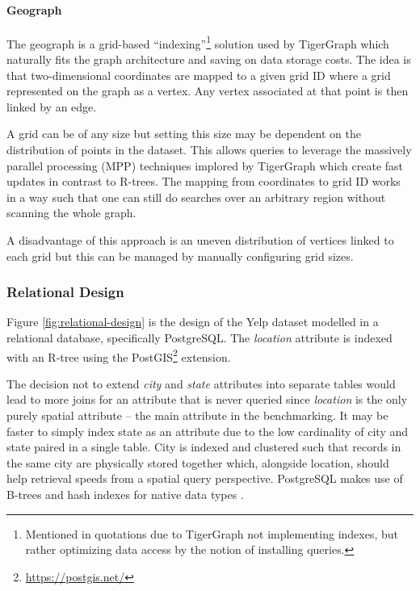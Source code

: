 \paragraph{Geograph}

The geograph is a grid-based ``indexing''\footnote{Mentioned in quotations due to TigerGraph not implementing indexes, but rather optimizing data access by the notion of installing queries.} solution used by TigerGraph which naturally fits the graph architecture and saving on data storage costs. The idea is that two-dimensional coordinates are mapped to a given grid ID where a grid represented on the graph as a vertex. Any vertex associated at that point is then linked by an edge.

A grid can be of any size but setting this size may be dependent on the distribution of points in the dataset. This allows queries to leverage the massively parallel processing (MPP) techniques implored by TigerGraph which create fast updates in contrast to R-trees. The mapping from coordinates to grid ID works in a way such that one can still do searches over an arbitrary region without scanning the whole graph.

A disadvantage of this approach is an uneven distribution of vertices linked to each grid but this can be managed by manually configuring grid sizes.

\subsubsection{Relational Design}
\label{subsub:relational-design}

Figure \ref{fig:relational-design} is the design of the Yelp dataset modelled in a relational database, specifically PostgreSQL. The \emph{location} attribute is indexed with an R-tree using the PostGIS\footnote{\url{https://postgis.net/}} extension.

The decision not to extend \emph{city} and \emph{state} attributes into separate tables would lead to more joins for an attribute that is never queried since \emph{location} is the only purely spatial attribute -- the main attribute in the benchmarking. It may be faster to simply index state as an attribute due to the low cardinality of city and state paired in a single table. City is indexed and clustered such that records in the same city are physically stored together which, alongside location, should help retrieval speeds from a spatial query perspective. PostgreSQL makes use of B-trees and hash indexes for native data types \cite{post-vs-mysql}.

